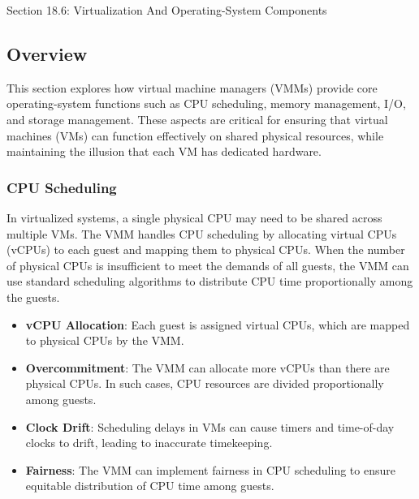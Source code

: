 \begin{notes}{Section 18.6: Virtualization And Operating-System Components}
    \subsection*{Overview}

    This section explores how virtual machine managers (VMMs) provide core operating-system functions such as CPU scheduling, memory management, I/O, and storage management. These aspects are critical 
    for ensuring that virtual machines (VMs) can function effectively on shared physical resources, while maintaining the illusion that each VM has dedicated hardware.
    
    \subsubsection*{CPU Scheduling}
    
    In virtualized systems, a single physical CPU may need to be shared across multiple VMs. The VMM handles CPU scheduling by allocating virtual CPUs (vCPUs) to each guest and mapping them to physical 
    CPUs. When the number of physical CPUs is insufficient to meet the demands of all guests, the VMM can use standard scheduling algorithms to distribute CPU time proportionally among the guests.
    
    \begin{highlight}
    
        \begin{itemize}
            \item \textbf{vCPU Allocation}: Each guest is assigned virtual CPUs, which are mapped to physical CPUs by the VMM.
            \item \textbf{Overcommitment}: The VMM can allocate more vCPUs than there are physical CPUs. In such cases, CPU resources are divided proportionally among guests.
            \item \textbf{Clock Drift}: Scheduling delays in VMs can cause timers and time-of-day clocks to drift, leading to inaccurate timekeeping.
            \item \textbf{Fairness}: The VMM can implement fairness in CPU scheduling to ensure equitable distribution of CPU time among guests.
        \end{itemize}
    
    \end{highlight}
    

\end{notes}
